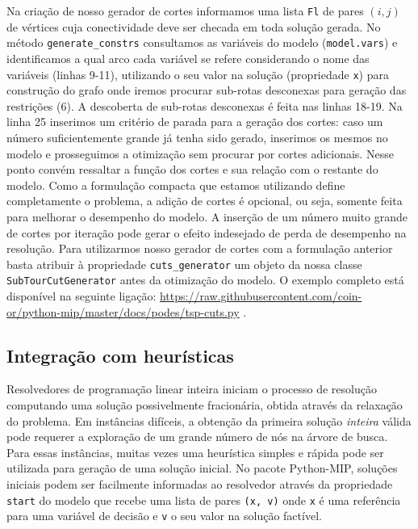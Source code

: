 \documentclass[a4paper,11pt,fleqn]{article}
\begin{document}
Na criação de nosso gerador de cortes informamos uma lista \texttt{Fl} de pares $(i,j)$ de vértices cuja conectividade deve ser checada em toda solução gerada. No método \texttt{generate\_constrs} consultamos as variáveis do modelo (\texttt{model.vars}) e identificamos a qual arco cada variável se refere considerando o nome das variáveis (linhas 9-11), utilizando o seu valor na solução (propriedade \texttt{x}) para construção do grafo onde iremos procurar sub-rotas desconexas para geração das restrições (6). A descoberta de sub-rotas desconexas é feita nas linhas 18-19. Na linha 25 inserimos um critério de parada para a geração dos cortes: caso um número suficientemente grande já tenha sido gerado, inserimos os mesmos no modelo e prosseguimos a otimização sem procurar por cortes adicionais. Nesse ponto convém ressaltar a função dos cortes e sua relação com o restante do modelo. Como a formulação compacta que estamos utilizando define completamente o problema, a adição de cortes é opcional, ou seja, somente feita para melhorar o desempenho do modelo. A inserção de um número muito grande de cortes por iteração pode gerar o efeito indesejado de perda de desempenho na resolução. Para utilizarmos nosso gerador de cortes com a formulação anterior basta atribuir à propriedade \texttt{cuts\_generator} um objeto da nossa classe \texttt{SubTourCutGenerator} antes da otimização do modelo. O exemplo completo está disponível na seguinte ligação: \url{https://raw.githubusercontent.com/coin-or/python-mip/master/docs/podes/tsp-cuts.py} .

\subsection{Integração com heurísticas}

Resolvedores de programação linear inteira iniciam o processo de resolução computando uma solução possivelmente fracionária, obtida através da relaxação do problema. Em instâncias difíceis, a obtenção da primeira solução \emph{inteira} válida pode requerer a exploração de um grande número de nós na árvore de busca. Para essas instâncias, muitas vezes uma heurística simples e rápida pode ser utilizada para geração de uma solução inicial. No pacote Python-MIP, soluções iniciais podem ser facilmente informadas ao resolvedor através da propriedade \texttt{start} do modelo que recebe uma lista de pares \texttt{(x, v)} onde \texttt{x} é uma referência para uma variável de decisão e \texttt{v} o seu valor na solução factível. 
\end{document}
